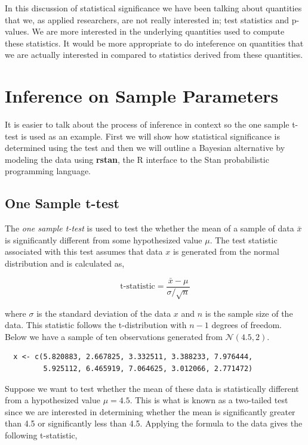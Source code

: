 \documentclass[12pt]{article}
\begin{document}
\noindent In this discussion of statistical significance we have been talking about quantities that we, as applied researchers, are not really interested in; test statistics and p-values. We are more interested in the underlying quantities used to compute these statistics. It would be more appropriate to do inteference on quantities that we are actually interested in compared to statistics derived from these quantities. \\

\section{Inference on Sample Parameters}

It is easier to talk about the process of inference in context so the one sample t-test is used as an example. First we will show how statistical significance is determined using the test and then we will outline a Bayesian alternative by modeling the data using \textbf{rstan}, the R interface to the Stan probabilistic programming language. \\

\subsection{One Sample t-test}

The \emph{one sample t-test} is used to test the whether the mean of a sample of data $\bar{x}$ is significantly different from some hypothesized value $\mu$. The test statistic associated with this test assumes that data $x$ is generated from the normal distribution and is calculated as,

$$
\mbox{t-statistic} = \frac{\bar{x}-\mu}{\sigma/\sqrt{n}}
$$

\noindent where $\sigma$ is the standard deviation of the data $x$ and $n$ is the sample size of the data. This statistic follows the t-distribution with $n-1$ degrees of freedom. \\

\noindent Below we have a sample of ten observations generated from $\mathcal{N}(4.5,2)$.

\begin{verbatim}
  x <- c(5.820883, 2.667825, 3.332511, 3.388233, 7.976444,
         5.925112, 6.465919, 7.064625, 3.012066, 2.771472)
\end{verbatim}

\noindent Suppose we want to test whether the mean of these data is statistically different from a hypothesized value $\mu = 4.5$. This is what is known as a two-tailed test since we are interested in determining whether the mean is significantly greater than 4.5 or significantly less than 4.5. Applying the formula to the data gives the following t-statistic,
\end{document}
